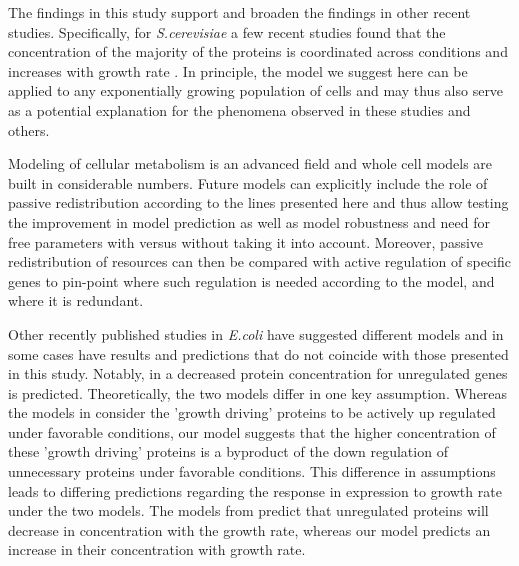 \documentclass[10pt,letterpaper]{article}
\begin{document}
The findings in this study support and broaden the findings in other recent studies.
Specifically, for \emph{S.cerevisiae} a few recent studies found that the concentration of the majority of the proteins is coordinated across conditions and increases with growth rate \cite{Keren2013,Gasch2000,Brauer2008a}.
In principle, the model we suggest here can be applied to any exponentially growing population of cells and may thus also serve as a potential explanation for the phenomena observed in these studies and others.

Modeling of cellular metabolism is an advanced field and whole cell models are built in considerable numbers.
Future models can explicitly include the role of passive redistribution according to the lines presented here and thus allow testing the improvement in model prediction as well as model robustness and need for free parameters with versus without taking it into account.
Moreover, passive redistribution of resources can then be compared with active regulation of specific genes to pin-point where such regulation is needed according to the model, and where it is redundant.

Other recently published studies in \emph{E.coli} have suggested different models and in some cases have results and predictions that do not coincide with those presented in this study.
Notably, in \cite{Klumpp2009,Klumpp2014} a decreased protein concentration for unregulated genes is predicted.
Theoretically, the two models differ in one key assumption.
Whereas the models in \cite{Klumpp2009,Scott2010,Scott2011,Klumpp2014} consider the 'growth driving' proteins to be actively up regulated under favorable conditions, our model suggests that the higher concentration of these 'growth driving' proteins is a byproduct of the down regulation of unnecessary proteins under favorable conditions.
This difference in assumptions leads to differing predictions regarding the response in expression to growth rate under the two models.
The models from \cite{Klumpp2009,Scott2010,Scott2011,Klumpp2014} predict that unregulated proteins will decrease in concentration with the growth rate, whereas our model predicts an increase in their concentration with growth rate.
\end{document}

